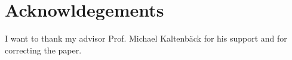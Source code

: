 \section{Acknowldegements}
I want to thank my advisor Prof. Michael Kaltenbäck for his support and for correcting the paper. 